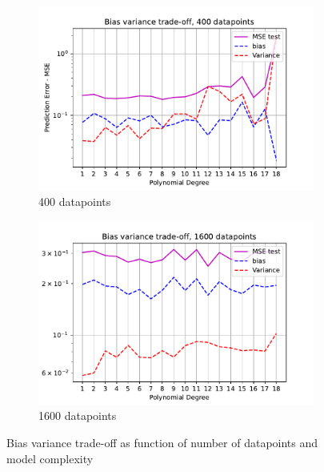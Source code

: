 \documentclass[11pt, a4paper]{article}
\begin{document}
\begin{figure}
  \centering
  \begin{subfigure}{0.49\textwidth}
      \centering
      \includegraphics[width=\textwidth]{figures/EX2_model_complexity_bias_var_function_n_20.pdf}
      \caption{400 datapoints}
      \label{fig:bias_var_n_20}
  \end{subfigure}
  \hfill
  \begin{subfigure}{0.49\textwidth}
      \centering
      \includegraphics[width=\textwidth]{figures/EX2_model_complexity_bias_var_function_n_40.pdf}
      \caption{1600 datapoints}
      \label{fig:bias_var_n_30}
  \end{subfigure}

     \caption{Bias variance trade-off as function of number of datapoints and model complexity}
     \label{fig:bias_var}
\end{figure}
\end{document}
